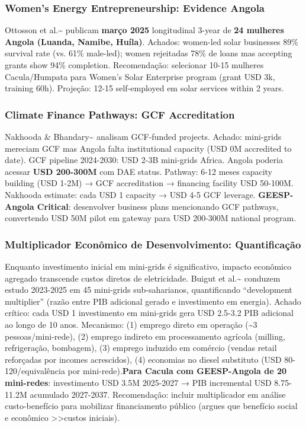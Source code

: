\documentclass[12pt, a4paper]{article}
\begin{document}
\subsubsection{Women's Energy Entrepreneurship: Evidence Angola}

Ottosson et al.\textasciitilde{}\citep{Ottosson2025} publicam
\textbf{março 2025} longitudinal 3-year de
\textbf{24 mulheres Angola (Luanda, Namibe, Huíla)}. Achados: women-led solar businesses 89\% survival rate (vs. 61\% male-led); women rejeitadas 78\% de loans mas accepting grants show 94\% completion. Recomendação: selecionar 10-15 mulheres Cacula/Humpata para Women's Solar Enterprise program (grant USD 3k, training 60h). Projeção: 12-15 self-employed em solar services within 2 years.

\subsubsection{Climate Finance Pathways: GCF Accreditation}

Nakhooda \& Bhandary\textasciitilde{}\citep{Nakhooda2024} analisam GCF-funded projects. Achado: mini-grids mereciam GCF mas Angola falta institutional capacity (USD 0M accredited to date). GCF pipeline 2024-2030: USD 2-3B mini-grids Africa. Angola poderia acessar
\textbf{USD 200-300M} com DAE status. Pathway: 6-12 meses capacity building (USD 1-2M) → GCF accreditation → financing facility USD 50-100M. Nakhooda estimate: cada USD 1 capacity → USD 4-5 GCF leverage.
\textbf{GEESP-Angola Critical}: desenvolver business plans mencionando GCF pathways, convertendo USD 50M pilot em gateway para USD 200-300M national program.

\subsubsection{Multiplicador Econômico de Desenvolvimento: Quantificação}

Enquanto investimento inicial em mini-grids é significativo, impacto econômico agregado transcende custos diretos de eletricidade. Buigut et al.\textasciitilde{}\citep{Buigut2025} conduzem estudo 2023-2025 em 45 mini-grids sub-saharianos, quantificando ``development multiplier'' (razão entre PIB adicional gerado e investimento em energia). Achado crítico: cada USD 1 investimento em mini-grids gera USD 2.5-3.2 PIB adicional ao longo de 10 anos. Mecanismo: (1) emprego direto em operação (\textasciitilde{}3 pessoas/mini-rede), (2) emprego indireto em processamento agrícola (milling, refrigeração, bombagem), (3) emprego induzido em comércio (vendas retail reforçadas por incomes acrescidos), (4) economias no diesel substituto (USD 80-120/equivalência por mini-rede).\textbf{Para Cacula com GEESP-Angola de 20 mini-redes}: investimento USD 3.5M 2025-2027 → PIB incremental USD 8.75-11.2M acumulado 2027-2037. Recomendação: incluir multiplicador em análise custo-benefício para mobilizar financiamento público (argues que benefício social e econômico >>custos iniciais).
\end{document}
